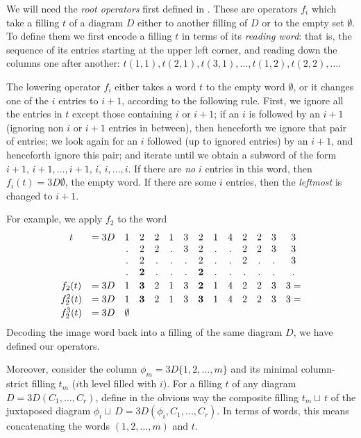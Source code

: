 We will need the {\em root operators} first defined in
\cite{LS3}.  These are operators $f_i$ which
take a filling $t$ of a diagram $D$ either to another filling of $D$
or to the empty set $\emptyset$.  To
define them we first encode a filling $t$ in terms of its
{\em reading word}:  that is, the sequence
of its entries starting at the upper left corner,
and reading down the columns one after another:
$t(1,1), t(2,1), t(3,1), \ldots, t(1,2), t(2,2), \ldots $.

The lowering operator $f_i$ either takes a word $t$ to the
empty word $\emptyset$,
or it changes one of the $i$ entries to $i+1$,
according to the following rule.  First, we ignore all the entries
in $t$ except those containing $i$ or $i+1$;  if an $i$ is
followed by an $i+1$ (ignoring non $i$ or $i+1$ entries in between),
then henceforth we ignore that pair of entries; we look again
for an $i$ followed (up to ignored entries) by an $i+1$,
and henceforth ignore this pair; and iterate until we obtain
a subword of the form $i+1,\, i+1,\ldots, i+1,\, i,\, i, \ldots, i$.
If there are {\em no} $i$ entries in this word, then
$f_i(t) =3D \emptyset$, the empty word.  If there are some $i$ entries,
then the {\em leftmost} is changed to $i+1$.

For example, we apply $f_2$ to the word
$$
\begin{array}{cccccccccccccc}
 t & =3D & 1 & 2 & 2 & 1 & 3 & 2 & 1 & 4 & 2 & 2 & 3 & 3 \\
   &   & . & 2 & 2 & . & 3 & 2 & . & . & 2 & 2 & 3 & 3 \\
   &   & . & 2 & . & . & . & 2 & . & . & 2 & . & . & 3 \\
   &   & . & {\bf 2} & . & . & . & {\bf 2} & . & . & . & . & . & .
\\[.2em]
f_2(t) & =3D &
         1 & {\bf 3} & 2 & 1 & 3 & {\bf 2} & 1 & 4 & 2 & 2 & 3 & 3  =
\\[.2em]
f_2^2(t) & =3D &
         1 & {\bf 3} & 2 & 1 & 3 & {\bf 3} & 1 & 4 & 2 & 2 & 3 & 3  =
\\[.2em]
f_2^3(t) & =3D & \emptyset
           &   &   &   &   &   &   &   &   &   &   &
\end{array}
$$
Decoding the image word back into a filling of the same diagram
$D$, we have defined our operators.

Moreover, consider the column
$\phi_m =3D \{1,2,\ldots,m\}$
and its minimal
column-strict filling
$t_m$ ($i$th level filled with $i$).
For a filling $t$ of any diagram
$D =3D (C_1,\ldots,C_r)$,
define in the obvious way
the composite filling $t_m \sqcup\, t$ of the
juxtaposed diagram $\phi_i \sqcup\, D =3D (\phi_i, C_1, \ldots, C_r)$.
In terms of words, this means
concatenating the words $(1,2,\ldots,m)$ and $t$.

